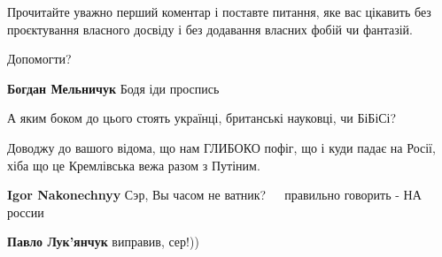 \begin{itemize}
\begin{itemize}
\begin{itemize}
Прочитайте уважно перший коментар і поставте питання, яке вас цікавить без
проєктування власного досвіду і без додавання власних фобій чи фантазій.

Допомогти?

 
\textbf{Богдан Мельничук} Бодя іди проспись

\end{itemize}

\end{itemize}

 

А яким боком до цього стоять українці, британські науковці, чи БіБіСі?

Доводжу до вашого відома, що нам ГЛИБОКО пофіг, що і куди падає на Росії, хіба
що це Кремлівська вежа разом з Путіним.

\begin{itemize}
 
\textbf{Igor Nakonechnyy} Сэр, Вы часом не ватник? 🤣🤣🤣 правильно говорить - НА россии 🤣🤣🤣

 
\textbf{Павло Лук'янчук} виправив, сер!))
\end{itemize}

 


\end{itemize}
